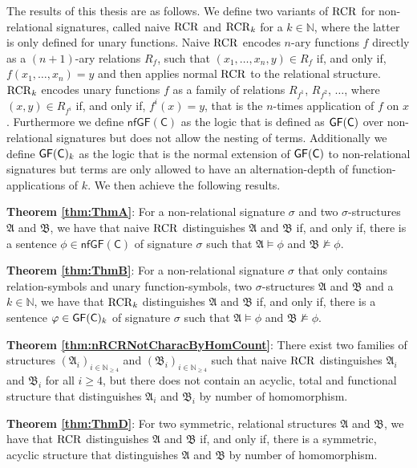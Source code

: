 The results of this thesis are as follows.
We define two variants of $\operatorname{RCR}$ for non-relational signatures, called naive $\operatorname{RCR}$ and $\operatorname{RCR}_k$ for a $k\in\mathbb{N}$, where the latter is only defined for unary functions.
Naive $\operatorname{RCR}$ encodes $n$-ary functions $f$ directly as a $(n+1)$-ary relations $R_f$, such that $(x_1,\dots,x_n,y)\in R_f$ if, and only if, $f(x_1,\dots,x_n)=y$ and then applies normal $\operatorname{RCR}$ to the relational structure.
$\operatorname{RCR}_k$ encodes unary functions $f$ as a family of relations $R_{f^1}$, $R_{f^2}$, $\dots$, where $(x,y)\in R_{f^i}$ if, and only if, $f^i(x)=y$, that is the $n$-times application of $f$ on $x$.
Furthermore we define $\mathsf{nfGF}(\mathsf C)$ as the logic that is defined as $\mathsf{GF}(\mathsf{C})$ over non-relational signatures but does not allow the nesting of terms. 
Additionally we define $\mathsf{GF}(\mathsf{C})_k$ as the logic that is the normal extension of $\mathsf{GF}(\mathsf{C})$ to non-relational signatures but terms are only allowed to have an alternation-depth of function-applications of $k$.
We then achieve the following results.

\textbf{Theorem \ref{thm:ThmA}}:
For a non-relational signature $\sigma$ and two $\sigma$-structures $\mathfrak A$ and $\mathfrak B$, we have that naive $\operatorname{RCR}$ distinguishes $\mathfrak A$ and $\mathfrak B$ if, and only if, there is a sentence $\phi\in \mathsf{nfGF}(\mathsf C)$ of signature $\sigma$ such that $\mathfrak A\models \phi$ and $\mathfrak B\not\models \phi$.

\textbf{Theorem \ref{thm:ThmB}}:
For a non-relational signature $\sigma$ that only contains relation-symbols and unary function-symbols, two $\sigma$-structures $\mathfrak A$ and $\mathfrak B$ and a $k\in\mathbb N$, we have that $\operatorname{RCR}_k$ distinguishes $\mathfrak A$ and $\mathfrak B$ if, and only if, there is a sentence $\varphi\in \mathsf{GF}(\mathsf{C})_k$ of signature $\sigma$ such that $\mathfrak A\models \phi$ and $\mathfrak B\not\models \phi$.

\textbf{Theorem \ref{thm:nRCRNotCharacByHomCount}}:
There exist two families of structures $(\mathfrak A_i)_{i\in\mathbb N_{\geq 4}}$ and $(\mathfrak B_i)_{i\in\mathbb N_{\geq 4}}$ such that naive $\operatorname{RCR}$ distinguishes $\mathfrak A_i$ and $\mathfrak B_i$ for all $i\geq4$, but there does not contain an acyclic, total and functional structure that distinguishes $\mathfrak A_i$ and $\mathfrak B_i$ by number of homomorphism.

\textbf{Theorem \ref{thm:ThmD}}:
For two symmetric, relational structures $\mathfrak A$ and $\mathfrak B$, we have that $\operatorname{RCR}$ distinguishes $\mathfrak A$ and $\mathfrak B$ if, and only if, there is a symmetric, acyclic structure that distinguishes $\mathfrak A$ and $\mathfrak B$ by number of homomorphism.

